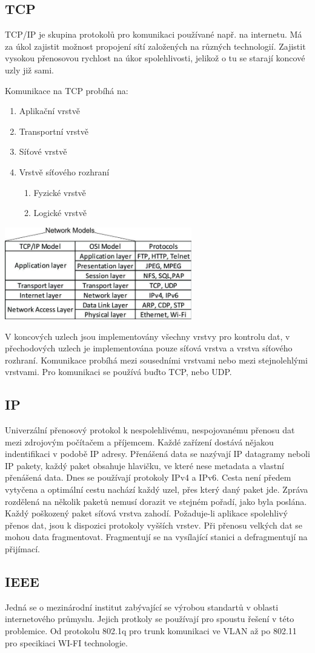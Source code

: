 \subsection{TCP}
TCP/IP je skupina protokolů pro komunikaci používané např. na internetu.
Má za úkol zajistit možnost propojení sítí založených na různých technologií.
Zajistit vysokou přenosovou rychlost na úkor spolehlivosti, jelikož o tu se starají koncové uzly již sami.
\begin{multicols}{2}
  Komunikace na TCP probíhá na: \\
  \begin{enumerate}
    \item Aplikační vrstvě
    \item Transportní vrstvě
    \item Síťové vrstvě
    \item Vrstvě síťového rozhraní
          \begin{enumerate}
            \item Fyzické vrstvě
            \item Logické vrstvě
          \end{enumerate}
  \end{enumerate}
  \columnbreak
  \includegraphics[height=4cm]{TVY-POS/ISO-OSI-TCP-IP/tcpip.jpg}
\end{multicols}
V koncových uzlech jsou implementovány všechny vrstvy pro kontrolu dat, v přechodových uzlech je implementována pouze síťová vrstva a vrstva síťového rozhraní.
Komunikace probíhá mezi sousedními vrstvami nebo mezi stejnolehlými vrstvami.
Pro komunikaci se používá buďto TCP, nebo UDP.
\subsection{IP}
Univerzální přenosový protokol k nespolehlivému, nespojovanému přenosu dat mezi zdrojovým počítačem a příjemcem.
Každé zařízení dostává nějakou indentifikaci v podobě IP adresy.
Přenášená data se nazývají IP datagramy neboli IP pakety, každý paket obsahuje hlavičku, ve které nese metadata a vlastní přenášená data.
Dnes se používají protokoly IPv4 a IPv6.
Cesta není předem vytyčena a optimální cestu nachází každý uzel, přes který daný paket jde.
Zpráva rozdělená na několik paketů nemusí dorazit ve stejném pořadí, jako byla poslána.
Každý poškozený paket síťová vrstva zahodí.
Požaduje-li aplikace spolehlivý přenos dat, jsou k dispozici protokoly vyšších vrstev.
Při přenosu velkých dat se mohou data fragmentovat.
Fragmentují se na vysílající stanici a defragmentují na přijímací.
\subsection{IEEE}
Jedná se o mezinárodní institut zabývající se výrobou standartů v oblasti internetového průmyslu.
Jejich protkoly se používají pro spoustu řešení v této problemice.
Od protokolu 802.1q pro trunk komunikaci ve VLAN až po 802.11 pro specikiaci WI-FI technologie.

